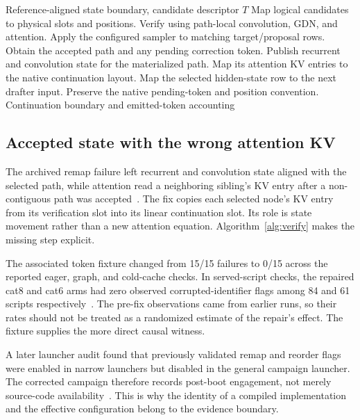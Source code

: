 \documentclass[conference]{IEEEtran}
\begin{document}
\begin{algorithm}[t]
\caption{Logical verifier and continuation boundary}
\label{alg:verify}
\begin{algorithmic}[1]
\REQUIRE Reference-aligned state boundary, candidate descriptor $T$
\STATE Map logical candidates to physical slots and positions.
\STATE Verify using path-local convolution, GDN, and attention.
\STATE Apply the configured sampler to matching target/proposal rows.
\STATE Obtain the accepted path and any pending correction token.
\STATE Publish recurrent and convolution state for the materialized path.
\STATE Map its attention KV entries to the native continuation layout.
\STATE Map the selected hidden-state row to the next drafter input.
\STATE Preserve the native pending-token and position convention.
\RETURN Continuation boundary and emitted-token accounting
\end{algorithmic}
\end{algorithm}

\subsection{Accepted state with the wrong attention KV}
The archived remap failure left recurrent and convolution state aligned with the selected path, while attention read a neighboring sibling's KV entry after a non-contiguous path was accepted~\cite{lumo2026stateless}. The fix copies each selected node's KV entry from its verification slot into its linear continuation slot. Its role is state movement rather than a new attention equation. Algorithm~\ref{alg:verify} makes the missing step explicit.

The associated token fixture changed from 15/15 failures to 0/15 across the reported eager, graph, and cold-cache checks. In served-script checks, the repaired cat8 and cat6 arms had zero observed corrupted-identifier flags among 84 and 61 scripts respectively~\cite{lumo2026stateless}. The pre-fix observations came from earlier runs, so their rates should not be treated as a randomized estimate of the repair's effect. The fixture supplies the more direct causal witness.

A later launcher audit found that previously validated remap and reorder flags were enabled in narrow launchers but disabled in the general campaign launcher. The corrected campaign therefore records post-boot engagement, not merely source-code availability~\cite{lumo2026archive}. This is why the identity of a compiled implementation and the effective configuration belong to the evidence boundary.
\end{document}
